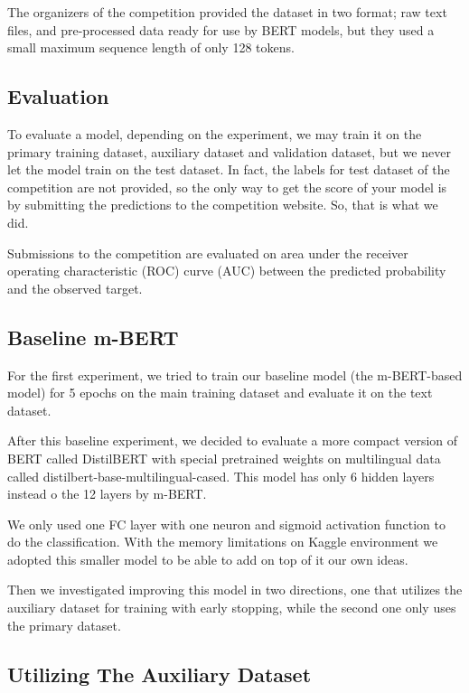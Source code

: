 \documentclass[10pt,twocolumn,letterpaper]{article}
\begin{document}
The organizers of the competition provided the dataset in two format; raw text files, and pre-processed data ready for use by BERT models, but they used a small maximum sequence length of only 128 tokens. 

\subsection{Evaluation}

To evaluate a model, depending on the experiment, we may train it on the primary training dataset, auxiliary dataset and validation dataset, but we never let the model train on the test dataset. In fact, the labels for test dataset of the competition are not provided, so the only way to get the score of your model is by submitting the predictions to the competition website. So, that is what we did.

Submissions to the competition are evaluated on area under the receiver operating characteristic (ROC) curve (AUC) between the predicted probability and the observed target. 


  
\subsection{Baseline m-BERT}

For the first experiment, we tried to train our baseline model (the m-BERT-based model) for 5 epochs on the main training dataset and evaluate it on the text dataset. 

After this baseline experiment, we decided to evaluate a more compact version of BERT called DistilBERT with special pretrained weights on multilingual data called distilbert-base-multilingual-cased. This model has only 6 hidden layers instead o the 12 layers by m-BERT. 

We only used one FC layer with one neuron and sigmoid activation function to do the classification. With the memory  limitations on Kaggle environment we adopted this smaller model to be able to add on top of it our own ideas.

Then we investigated improving this model in two directions, one that utilizes the auxiliary dataset for training with early stopping, while the second one only uses the primary dataset.


\subsection{Utilizing The Auxiliary Dataset}
\end{document}

